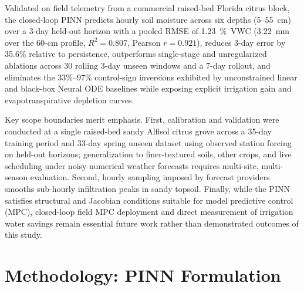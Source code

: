 \documentclass[pdflatex,sn-nature]{sn-jnl}%
\theoremstyle{thmstyleone}%
\theoremstyle{thmstyletwo}%
\theoremstyle{thmstylethree}%
\begin{document}
Validated on field telemetry from a commercial raised-bed Florida citrus block, the closed-loop PINN predicts hourly soil moisture across six depths (5--55~\si{cm}) over a 3-day held-out horizon with a pooled RMSE of \SI{1.23}{\%VWC} (\SI{3.22}{mm} over the 60-\si{cm} profile, $R^2 = 0.807$, Pearson $r = 0.921$), reduces 3-day error by 35.6\% relative to persistence, outperforms single-stage and unregularized ablations across 30 rolling 3-day unseen windows and a 7-day rollout, and eliminates the 33\%--97\% control-sign inversions exhibited by unconstrained linear and black-box Neural ODE baselines while exposing explicit irrigation gain and evapotranspirative depletion curves.

Key scope boundaries merit emphasis. First, calibration and validation were conducted at a single raised-bed sandy Alfisol citrus grove across a 35-day training period and 33-day spring unseen dataset using observed station forcing on held-out horizons; generalization to finer-textured soils, other crops, and live scheduling under noisy numerical weather forecasts requires multi-site, multi-season evaluation. Second, hourly sampling imposed by forecast providers smooths sub-hourly infiltration peaks in sandy topsoil. Finally, while the PINN satisfies structural and Jacobian conditions suitable for model predictive control (MPC), closed-loop field MPC deployment and direct measurement of irrigation water savings remain essential future work rather than demonstrated outcomes of this study.


\section{Methodology: PINN Formulation} \label{Methodology}
\end{document}
